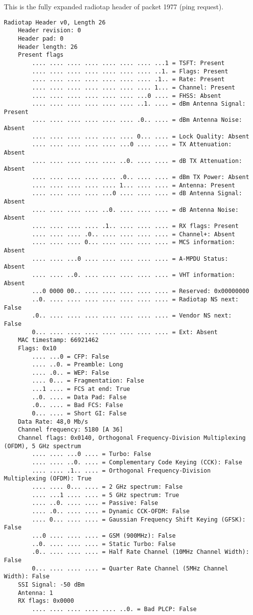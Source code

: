 This is the fully expanded radiotap header of packet 1977 (ping request).

\begin{lstlisting}
Radiotap Header v0, Length 26
    Header revision: 0
    Header pad: 0
    Header length: 26
    Present flags
        .... .... .... .... .... .... .... ...1 = TSFT: Present
        .... .... .... .... .... .... .... ..1. = Flags: Present
        .... .... .... .... .... .... .... .1.. = Rate: Present
        .... .... .... .... .... .... .... 1... = Channel: Present
        .... .... .... .... .... .... ...0 .... = FHSS: Absent
        .... .... .... .... .... .... ..1. .... = dBm Antenna Signal: Present
        .... .... .... .... .... .... .0.. .... = dBm Antenna Noise: Absent
        .... .... .... .... .... .... 0... .... = Lock Quality: Absent
        .... .... .... .... .... ...0 .... .... = TX Attenuation: Absent
        .... .... .... .... .... ..0. .... .... = dB TX Attenuation: Absent
        .... .... .... .... .... .0.. .... .... = dBm TX Power: Absent
        .... .... .... .... .... 1... .... .... = Antenna: Present
        .... .... .... .... ...0 .... .... .... = dB Antenna Signal: Absent
        .... .... .... .... ..0. .... .... .... = dB Antenna Noise: Absent
        .... .... .... .... .1.. .... .... .... = RX flags: Present
        .... .... .... .0.. .... .... .... .... = Channel+: Absent
        .... .... .... 0... .... .... .... .... = MCS information: Absent
        .... .... ...0 .... .... .... .... .... = A-MPDU Status: Absent
        .... .... ..0. .... .... .... .... .... = VHT information: Absent
        ...0 0000 00.. .... .... .... .... .... = Reserved: 0x00000000
        ..0. .... .... .... .... .... .... .... = Radiotap NS next: False
        .0.. .... .... .... .... .... .... .... = Vendor NS next: False
        0... .... .... .... .... .... .... .... = Ext: Absent
    MAC timestamp: 66921462
    Flags: 0x10
        .... ...0 = CFP: False
        .... ..0. = Preamble: Long
        .... .0.. = WEP: False
        .... 0... = Fragmentation: False
        ...1 .... = FCS at end: True
        ..0. .... = Data Pad: False
        .0.. .... = Bad FCS: False
        0... .... = Short GI: False
    Data Rate: 48,0 Mb/s
    Channel frequency: 5180 [A 36]
    Channel flags: 0x0140, Orthogonal Frequency-Division Multiplexing (OFDM), 5 GHz spectrum
        .... .... ...0 .... = Turbo: False
        .... .... ..0. .... = Complementary Code Keying (CCK): False
        .... .... .1.. .... = Orthogonal Frequency-Division Multiplexing (OFDM): True
        .... .... 0... .... = 2 GHz spectrum: False
        .... ...1 .... .... = 5 GHz spectrum: True
        .... ..0. .... .... = Passive: False
        .... .0.. .... .... = Dynamic CCK-OFDM: False
        .... 0... .... .... = Gaussian Frequency Shift Keying (GFSK): False
        ...0 .... .... .... = GSM (900MHz): False
        ..0. .... .... .... = Static Turbo: False
        .0.. .... .... .... = Half Rate Channel (10MHz Channel Width): False
        0... .... .... .... = Quarter Rate Channel (5MHz Channel Width): False
    SSI Signal: -50 dBm
    Antenna: 1
    RX flags: 0x0000
        .... .... .... .... .... ..0. = Bad PLCP: False
\end{lstlisting}
